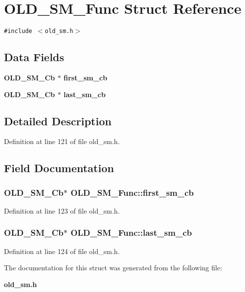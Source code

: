 \section{OLD\_\-SM\_\-Func Struct Reference}
\label{structOLD__SM__Func}
{\tt \#include $<$old\_\-sm.h$>$}

\subsection*{Data Fields}
\begin{CompactItemize}
\item 
\bf{OLD\_\-SM\_\-Cb} $\ast$ \bf{first\_\-sm\_\-cb}
\item 
\bf{OLD\_\-SM\_\-Cb} $\ast$ \bf{last\_\-sm\_\-cb}
\end{CompactItemize}


\subsection{Detailed Description}




Definition at line 121 of file old\_\-sm.h.

\subsection{Field Documentation}
\subsubsection{\setlength{\rightskip}{0pt plus 5cm}\bf{OLD\_\-SM\_\-Cb}$\ast$ \bf{OLD\_\-SM\_\-Func::first\_\-sm\_\-cb}}\label{structOLD__SM__Func_95adcedfc9a70df9c8fd985bb8c73784}




Definition at line 123 of file old\_\-sm.h.
\subsubsection{\setlength{\rightskip}{0pt plus 5cm}\bf{OLD\_\-SM\_\-Cb}$\ast$ \bf{OLD\_\-SM\_\-Func::last\_\-sm\_\-cb}}\label{structOLD__SM__Func_9d9ba650c0484185274ed2208676fcbc}




Definition at line 124 of file old\_\-sm.h.

The documentation for this struct was generated from the following file:\begin{CompactItemize}
\item 
\bf{old\_\-sm.h}\end{CompactItemize}

